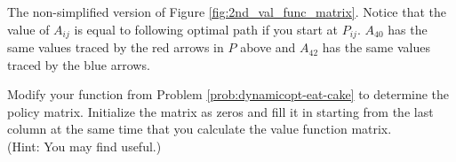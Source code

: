 \begin{center}
\end{center}

The non-simplified version of Figure \ref{fig:2nd_val_func_matrix}. Notice that the value of $A_{ij}$ is equal to following optimal path if you start at $P_{ij}$.
$A_{40}$ has the same values traced by the red arrows in $P$ above and $A_{42}$ has the same values traced by the blue arrows.

\begin{problem}
Modify your function from Problem \ref{prob:dynamicopt-eat-cake} to determine the policy matrix.
Initialize the matrix as zeros and fill it in starting from the last column at the same time that you calculate the value function matrix.
\\(Hint: You may find  useful.)
\end{problem}


